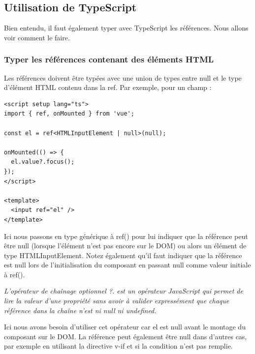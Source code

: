 \subsection{Utilisation de {\color{monOrange}TypeScript}}
Bien entendu, il faut également typer avec {\color{monOrange}TypeScript} les références. Nous allons voir comment le faire.

\subsubsection{Typer les références contenant des éléments HTML}
Les références doivent être typées avec une union de types entre {\color{monOrange}null} et le type d'élément HTML contenu dans la {\color{monOrange}ref}. Par exemple, pour un champ :
\begin{verbatim}
<script setup lang="ts">
import { ref, onMounted } from 'vue';

const el = ref<HTMLInputElement | null>(null);

onMounted(() => {
  el.value?.focus();
});
</script>

<template>
  <input ref="el" />
</template>
\end{verbatim}
Ici nous passons en type générique {\tt <HTMLInputElement | null>} à {\color{monOrange}ref()} pour lui indiquer que la référence peut être null (lorsque l'élément n'est pas encore sur le DOM) ou alors un élément de type {\color{monOrange}HTMLInputElement}. Notez également qu'il faut indiquer que la référence est null lors de l'initialisation du composant en passant null comme valeur initiale à {\color{monOrange}ref()}.

{\em L'opérateur de chaînage optionnel ?. est un opérateur JavaScript qui permet de lire la valeur d'une propriété sans avoir à valider expressément que chaque référence dans la chaîne n'est ni {\color{monOrange}null} ni {\color{monOrange}undefined}.}

Ici nous avons besoin d'utiliser cet opérateur car {\color{monOrange}el} est {\color{monOrange}null} avant le montage du composant sur le DOM. La référence peut également être null dans d'autres cas, par exemple en utilisant la directive {\color{monOrange}v-if} et si la condition n'est pas remplie.

